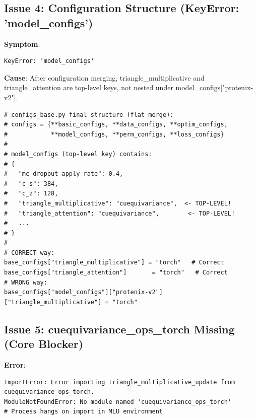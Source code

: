 \documentclass[12pt,a4paper]{article}
\begin{document}
\subsection{Issue 4: Configuration Structure (KeyError: 'model_configs')}

\textbf{Symptom}:
\begin{verbatim}
KeyError: 'model_configs'
\end{verbatim}

\textbf{Cause}: After configuration merging, triangle_multiplicative and triangle_attention are top-level keys, not nested under model_configs["protenix-v2"].

\begin{verbatim}
# configs_base.py final structure (flat merge):
# configs = {**basic_configs, **data_configs, **optim_configs,
#            **model_configs, **perm_configs, **loss_configs}
#
# model_configs (top-level key) contains:
# {
#   "mc_dropout_apply_rate": 0.4,
#   "c_s": 384,
#   "c_z": 128,
#   "triangle_multiplicative": "cuequivariance",  <- TOP-LEVEL!
#   "triangle_attention": "cuequivariance",        <- TOP-LEVEL!
#   ...
# }
#
# CORRECT way:
base_configs["triangle_multiplicative"] = "torch"   # Correct
base_configs["triangle_attention"]       = "torch"   # Correct
# WRONG way:
base_configs["model_configs"]["protenix-v2"]["triangle_multiplicative"] = "torch"
\end{verbatim}

\clearpage

\subsection{Issue 5: cuequivariance_ops_torch Missing (Core Blocker)}

\textbf{Error}:
\begin{verbatim}
ImportError: Error importing triangle_multiplicative_update from cuequivariance_ops_torch.
ModuleNotFoundError: No module named 'cuequivariance_ops_torch'
# Process hangs on import in MLU environment
\end{verbatim}
\end{document}
